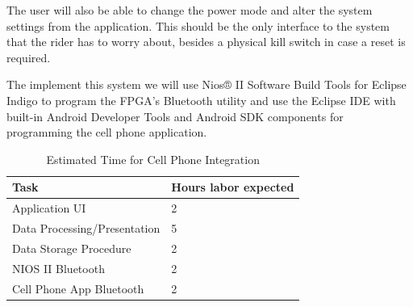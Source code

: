 \documentclass[12pt,article]{IEEEtran}
\begin{document}
            The user will also be able to change the power mode and alter the system settings from the
            application. This should be the only interface to the system that the rider has to worry about,
            besides a physical kill switch in case a reset is required.
            
    	    The implement this system we will use Nios® II Software Build Tools for Eclipse Indigo to program 
            the FPGA's Bluetooth utility and use the Eclipse IDE with built-in Android Developer Tools and Android 
            SDK components for programming the cell phone application.
    
        \begin{table}[H]        
            \renewcommand{\arraystretch}{1.3}
    			\caption{Estimated Time for Cell Phone Integration}
    			
    			\label{Estimated Time}
    			
    			\centering
    			\begin{tabular}{p{6cm}|p{1.6cm}}
    			\hline
    			\bfseries 	Task 				        	& \bfseries Hours labor expected     		   \\
    			\hline\hline
    						Application UI 		            & 2						    	            \\
    						Data Processing/Presentation    & 5                                         \\
                            Data Storage Procedure    	    & 2			                                \\	
    						NIOS II Bluetooth	            & 2				                            \\	
    						Cell Phone App Bluetooth   	    & 2				                            \\
                            \hline        					
    		    \end{tabular}
    	\end{table}




\end{document}
